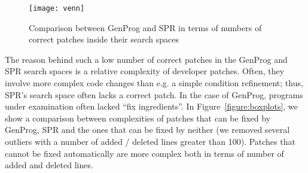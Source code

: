 \begin{figure}
    \centering
    \texttt{[image: venn]}
    \vspace{0.1in}
    \caption{Comparison between GenProg and SPR in terms of numbers of correct patches inside their search spaces}
    \label{figure:venn}
\end{figure}

The reason behind such a low number of correct patches in the GenProg and SPR search spaces is a relative complexity of developer patches. Often, they involve more complex code changes than e.g. a simple condition refinement; thus, SPR's search space often lacks a correct patch. In the case of GenProg, programs under examination often lacked ``fix ingredients''. In Figure~\ref{figure:boxplots}, we show a comparison between complexities of patches that can be fixed by GenProg, SPR and the ones that can be fixed by neither (we removed several outliers with a number of added / deleted lines greater than 100). Patches that cannot be fixed automatically are more complex both in terms of number of added and deleted lines.

